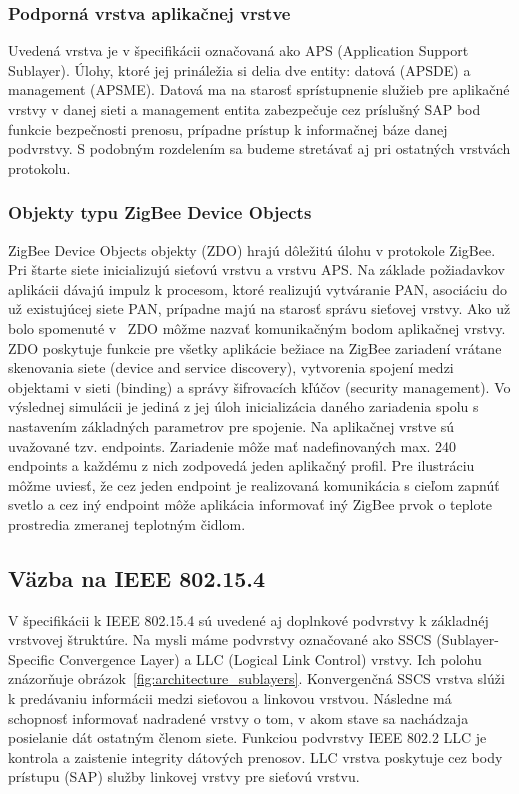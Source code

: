 \subsubsection{Podporná vrstva aplikačnej vrstve}
\indent\indent Uvedená vrstva je v špecifikácii označovaná ako APS (Application Support Sublayer). Úlohy, ktoré jej prináležia si delia dve entity: datová (APSDE) a management (APSME). Datová ma na starosť sprístupnenie služieb pre aplikačné vrstvy v danej sieti a management entita zabezpečuje cez príslušný SAP bod funkcie bezpečnosti prenosu, prípadne prístup k informačnej báze danej podvrstvy. S podobným rozdelením sa budeme stretávať aj pri ostatných vrstvách protokolu.\\

\subsubsection{Objekty typu ZigBee Device Objects}
\indent\indent ZigBee Device Objects objekty (ZDO) hrajú dôležitú úlohu v protokole ZigBee. Pri štarte siete inicializujú sieťovú vrstvu a vrstvu APS. Na základe požiadavkov aplikácii dávajú impulz k procesom, ktoré realizujú vytváranie PAN, asociáciu do už existujúcej siete PAN, prípadne majú na starosť správu sieťovej vrstvy. Ako už bolo spomenuté v~\cite{halas03} ZDO môžme nazvať komunikačným bodom aplikačnej vrstvy. ZDO poskytuje funkcie pre všetky aplikácie bežiace na ZigBee zariadení vrátane skenovania siete (device and service discovery), vytvorenia spojení medzi objektami v sieti (binding) a správy šifrovacích kľúčov (security management). Vo výslednej simulácii je jediná z jej úloh inicializácia daného zariadenia spolu s nastavením základných parametrov pre spojenie. Na aplikačnej vrstve sú uvažované tzv. endpoints. Zariadenie môže mať nadefinovaných max. 240 endpoints a každému z nich zodpovedá jeden aplikačný profil. Pre ilustráciu môžme uviesť, že cez jeden endpoint je realizovaná komunikácia s cieľom zapnúť svetlo a cez iný endpoint môže aplikácia informovať iný ZigBee prvok o teplote prostredia zmeranej teplotným čidlom.\\

\subsection{Väzba na IEEE 802.15.4}
\indent\indent V špecifikácii k IEEE 802.15.4 sú uvedené aj doplnkové podvrstvy k základnéj vrstvovej štruktúre. Na mysli máme podvrstvy označované ako SSCS (Sublayer-Specific Convergence Layer) a LLC (Logical Link Control) vrstvy. Ich polohu znázorňuje obrázok~\ref{fig:architecture_sublayers}. Konvergenčná SSCS vrstva slúži k predávaniu informácii medzi sieťovou a linkovou vrstvou. Následne má schopnosť informovať nadradené vrstvy o tom, v akom stave sa nachádzaja posielanie dát ostatným členom siete. Funkciou podvrstvy IEEE 802.2 LLC  je kontrola a zaistenie integrity dátových prenosov. LLC vrstva poskytuje cez body prístupu (SAP) služby linkovej vrstvy pre sieťovú vrstvu.\\

